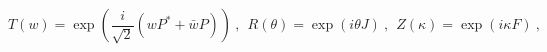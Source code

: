 \begin{equation}
 T (w) = \exp \left( \frac{i}{\sqrt{2}}( w P^* + \bar{w} P ) \right) ~,~~
 R (\theta) = \exp ( i \theta J) ~,~~
 Z (\kappa) = \exp ( i \kappa F) ~,
\end{equation}

